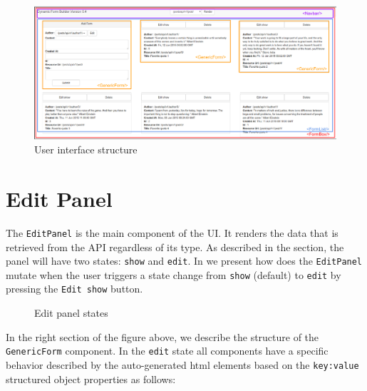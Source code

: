 \begin{figure}[H]
	\centering
		\includegraphics[scale=0.9, angle=90]{src/img/screenshot-app-0.pdf}
	\caption{User interface structure\label{img:main-view}}
\end{figure}

\section{Edit Panel}
\label{sec:edit-panel}

The \texttt{EditPanel} is the main component of the UI. It renders the data that is retrieved from the API regardless of its type. As described in the  section, the panel will have two states: \texttt{show} and \texttt{edit}. In  we present how does the \texttt{EditPanel} mutate when the user triggers a state change from \texttt{show} (default) to \texttt{edit} by pressing the \texttt{Edit show} button.

\begin{figure}[H]
	\centering
	\caption{Edit panel states\label{img:panels}}
\end{figure}


In the right section of the figure above, we describe the structure of the \texttt{GenericForm} component. In the \texttt{edit} state all components have a specific behavior described by the auto-generated html elements based on the \texttt{key:value} structured object properties as follows:

